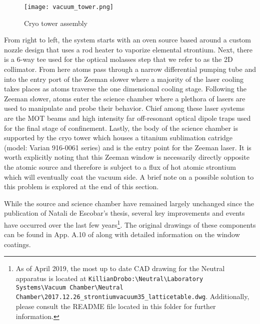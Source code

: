 	\begin{figure} 
		\centerline{
		\texttt{[image: vacuum\_tower.png]}}
		\caption{Cryo tower assembly}
		\label{fig:cryoTower}
	\end{figure}
From right to left, the system starts with an oven source based around a custom nozzle design that uses a rod heater to vaporize elemental strontium.
Next, there is a 6-way tee used for the optical molasses step that we refer to as the 2D collimator. 
From here atoms pass through a narrow differential pumping tube and into the entry port of the Zeeman slower where a majority of the laser cooling takes places as atoms traverse the one dimensional cooling stage. 
Following the Zeeman slower, atoms enter the science chamber where a plethora of lasers are used to manipulate and probe their behavior.
Chief among these laser systems are the MOT beams and high intensity far off-resonant optical dipole traps used for the final stage of confinement.
Lastly, the body of the science chamber is supported by the cryo tower which houses a titanium sublimation catridge (model: Varian 916-0061 series) and is the entry point for the Zeeman laser.
It is worth explicitly noting that this Zeeman window is necessarily directly opposite the atomic source and therefore is subject to a flux of hot atomic strontium which will eventually coat the vacuum side. A brief note on a possible solution to this problem is explored at the end of this section.

While the source and science chamber have remained largely unchanged since the publication of Natali de Escobar's thesis, several key improvements and events have occurred over the last few years\footnote{As of April 2019, the most up to date CAD drawing for the Neutral apparatus is located at \texttt{KillianDrobo:\textbackslash Neutral\textbackslash Laboratory Systems\textbackslash Vacuum Chamber\textbackslash Neutral Chamber\textbackslash 2017.12.26\_strontiumvacuum35\_latticetable.dwg}. Additionally, please consult the README file located in this folder for further information.}.
The original drawings of these components can be found in App. A.10 of \cite{MartinezdeEscolar2010} along with detailed information on the window coatings.





